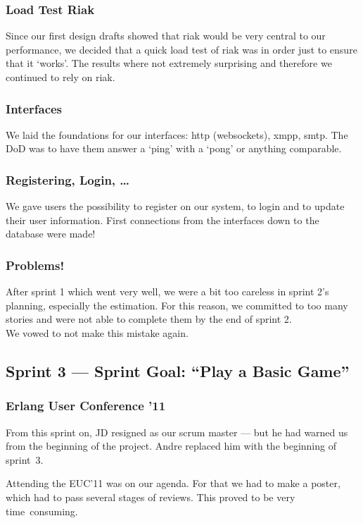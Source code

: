 \documentclass[11pt,a4paper]{report}
\begin{document}
\subsubsection{Load Test Riak}
Since our first design drafts showed that riak would be very central to our
performance, we decided that a quick load test of riak was in order just to
ensure that it `works'. The results where not extremely surprising and therefore
we continued to rely on riak.

\subsubsection{Interfaces}
We laid the foundations for our interfaces: http (websockets), xmpp, smtp.
The DoD was to have them answer a `ping' with a `pong' or anything comparable.

\subsubsection{Registering, Login, \ldots}
We gave users the possibility to register on our system, to login and to update
their user information. First connections from the interfaces down to the
database were made!

\subsubsection{Problems!}
After sprint 1 which went very well, we were a bit too careless in sprint 2's
planning, especially the estimation. For this reason, we committed to too many
stories and were not able to complete them by the end of sprint 2. \\
We vowed to not make this mistake again.

\subsection*{Sprint 3 --- Sprint Goal: ``Play a Basic Game''}
\subsubsection{Erlang User Conference '11}
From this sprint on, JD resigned as our scrum master --- but he had warned us
from the beginning of the project. Andre replaced him with the beginning of
sprint~3.

Attending the EUC'11 was on our agenda. For that we had to make a
poster, which had to pass several stages of reviews. This proved to be very
time~consuming.
\end{document}
